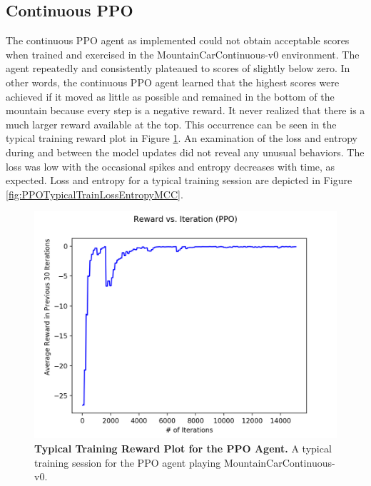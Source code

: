 \documentclass[conference]{IEEEtran}
\begin{document}
\subsection{Continuous PPO}
The continuous PPO agent as implemented could not obtain acceptable scores when trained and exercised in the MountainCarContinuous-v0 environment. The agent repeatedly and consistently plateaued to scores of slightly below zero. In other words, the continuous PPO agent learned that the highest scores were achieved if it moved as little as possible and remained in the bottom of the mountain because every step is a negative reward. It never realized that there is a much larger reward available at the top. This occurrence can be seen in the typical training reward plot in Figure \ref{fig:PPOTypicalTrainRewardMCC}. An examination of the loss and entropy during and between the model updates did not reveal any unusual behaviors. The loss was low with the occasional spikes and entropy decreases with time, as expected. Loss and entropy for a typical training session are depicted in Figure \ref{fig:PPOTypicalTrainLossEntropyMCC}.

\begin{figure}[htbp]
\centerline{\includegraphics[scale=0.5]{PPO_Train_Reward_Plot_MCC_Typical.png}}
\caption{\textbf{Typical Training Reward Plot for the PPO Agent.}  A typical training session for the PPO agent playing MountainCarContinuous-v0.}
\label{fig:PPOTypicalTrainRewardMCC}
\end{figure}
\end{document}

